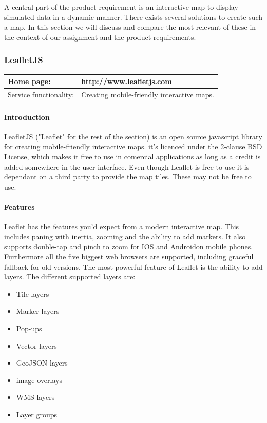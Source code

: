 \documentclass[11pt,a4paper,titlepage,oneside]{report}
\begin{document}
  A central part of the product requirement is an interactive map to display simulated data in a dynamic manner. There exists several solutions to create such a map. In this section we will discuss and compare the most relevant of these in the context of our assignment and the product requirements.


  \subsubsection{LeafletJS}
  \begin{tabular}{|p{4cm}|p{8cm}|}
    \hline
    Home page: & \url{http://www.leafletjs.com} \\
    \hline
    Service functionality: & Creating mobile-friendly interactive maps. \\
    \hline
  \end{tabular}
  
  \paragraph{Introduction} \indent
  LeafletJS ("Leaflet" for the rest of the section) is an open source javascript library for creating mobile-friendly interactive maps. it's licenced under the \href{'https://github.com/Leaflet/Leaflet/blob/master/LICENSE'}{2-clause BSD License}, which makes it free to use in comercial applications as long as a credit is added somewhere in the user interface.
  Even though Leaflet is free to use it is dependant on a third party to provide the map tiles. These may not be free to use.

  \paragraph{Features}
  Leaflet has the features you'd expect from a modern interactive map. This includes paning with inertia, zooming and the ability to add markers. It also supports double-tap and pinch to zoom for IOS and Androidon mobile phones. Furthermore all the five biggest web browsers are supported, including graceful fallback for old versions.
  The most powerful feature of Leaflet is the ability to add layers. 
  \newline The different supported layers are:

  \begin{itemize}
    \item Tile layers
    \item Marker layers
    \item Pop-ups
    \item Vector layers
    \item GeoJSON layers
    \item image overlays
    \item WMS layers
    \item Layer groups
  \end{itemize}
\end{document}
